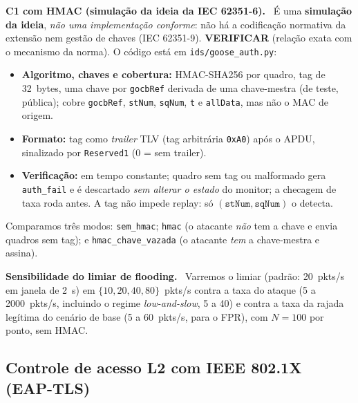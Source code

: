\documentclass[12pt]{article}
\renewcommand{\paragraph}[1]{\par\noindent\textbf{#1}\ }
\newcommand{\verif}{\textcolor{orange!80!black}{\textbf{VERIFICAR}}}
\begin{document}
\paragraph{C1 com HMAC (simula\c{c}\~ao da ideia da IEC 62351-6).} \'E uma \textbf{simula\c{c}\~ao da ideia}, \emph{n\~ao uma implementa\c{c}\~ao conforme}: n\~ao h\'a a codifica\c{c}\~ao normativa da extens\~ao nem gest\~ao de chaves (IEC 62351-9). \verif{} (rela\c{c}\~ao exata com o mecanismo da norma). O c\'odigo est\'a em \texttt{ids/goose\_auth.py}:
\begin{itemize}
  \item \textbf{Algoritmo, chaves e cobertura:} HMAC-SHA256 por quadro, tag de 32~bytes, uma chave por \texttt{gocbRef} derivada de uma chave-mestra (de teste, p\'ublica); cobre \texttt{gocbRef}, \texttt{stNum}, \texttt{sqNum}, \texttt{t} e \texttt{allData}, mas n\~ao o MAC de origem.
  \item \textbf{Formato:} tag como \emph{trailer} TLV (tag arbitr\'aria \texttt{0xA0}) ap\'os o APDU, sinalizado por \texttt{Reserved1} (0 = sem trailer).
  \item \textbf{Verifica\c{c}\~ao:} em tempo constante; quadro sem tag ou malformado gera \texttt{auth\_fail} e \'e descartado \emph{sem alterar o estado} do monitor; a checagem de taxa roda antes. A tag n\~ao impede replay: s\'o $(\texttt{stNum},\texttt{sqNum})$ o detecta.
\end{itemize}
Comparamos tr\^es modos: \texttt{sem\_hmac}; \texttt{hmac} (o atacante \emph{n\~ao} tem a chave e envia quadros sem tag); e \texttt{hmac\_chave\_vazada} (o atacante \emph{tem} a chave-mestra e assina).

\paragraph{Sensibilidade do limiar de flooding.} Varremos o limiar (padr\~ao: 20~pkts/s em janela de 2~s) em $\{10,20,40,80\}$~pkts/s contra a taxa do ataque (5 a 2000~pkts/s, incluindo o regime \emph{low-and-slow}, 5 a 40) e contra a taxa da rajada leg\'itima do cen\'ario de base (5 a 60~pkts/s, para o FPR), com $N=100$ por ponto, sem HMAC.

\subsection{Controle de acesso L2 com IEEE 802.1X (EAP-TLS)}\label{sec:8021x}
\end{document}
